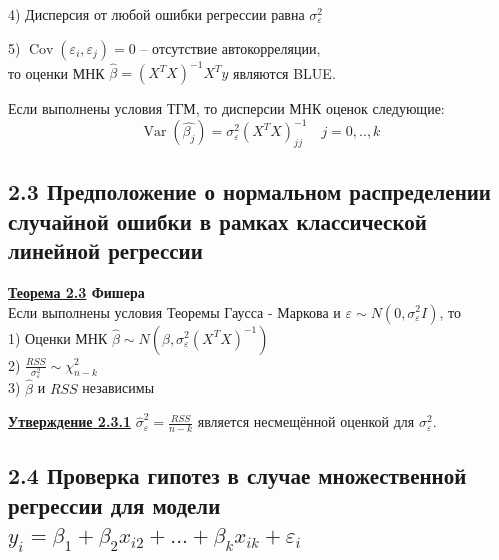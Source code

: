 \documentclass[a0,final]{a0poster}
\DeclareMathOperator{\Var}{Var}
\DeclareMathOperator{\Cov}{Cov}
\begin{document}
\begin{multicols}{4}
\begin{tcolorbox}[colback=red!5!white,colframe=red!75!black]
4) %
Дисперсия от любой ошибки регрессии равна $\sigma_{\varepsilon}^2$


5) $ \Cov{(\varepsilon_i, \varepsilon_j)} = 0$ -- отсутствие автокорреляции, \\
то оценки МНК $\hat{\beta} = (X^TX)^{-1}X^Ty$ являются BLUE.
\end{tcolorbox}

\begin{tcolorbox}[colback=blue!5!white,colframe=blue!75!black]
Если выполнены условия ТГМ, то дисперсии МНК оценок следующие: \\
$$\Var{(\hat{\beta_j})}= \sigma^2_{\varepsilon}(X^TX)^{-1}_{jj} \quad j = 0,..,k$$
\end{tcolorbox}

\subsection*{\textbf{2.3 Предположение о нормальном распределении случайной ошибки в рамках классической линейной регрессии}}
\begin{tcolorbox}[colback=green!5!white,colframe=green!75!black]
\textbf{\underline{Теорема 2.3} Фишера}\\
Если выполнены условия Теоремы Гаусса - Маркова и $\varepsilon \sim N(0, \sigma^2_{\varepsilon}I)$, то \\
1) Оценки МНК $\hat{\beta} \sim N(\beta, \sigma^2_{\varepsilon}(X^TX)^{-1})$ \\
2) $\frac{RSS}{\sigma^2_{\varepsilon}} \sim \chi^2_{n-k}$ \\
3) $\hat{\beta}$ и $RSS$ независимы
\end{tcolorbox}

\begin{tcolorbox}[colback=green!5!white,colframe=green!75!black]
\textbf{\underline{Утверждение 2.3.1}} $\hat{\sigma}^2_{\varepsilon} = \frac{RSS}{n-k}$ является несмещённой оценкой для $\sigma^2_{\varepsilon}.$
\end{tcolorbox}

\columnbreak

\subsection*{\textbf{2.4 Проверка гипотез в случае множественной регрессии для модели $y_i={\beta}_1 +{\beta}_2x_{i2} + ... + \beta_kx_{ik} + {\varepsilon}_i$}}

\end{multicols}
\end{document}
